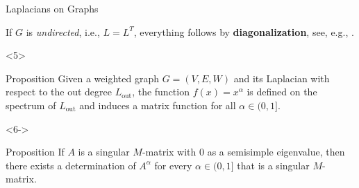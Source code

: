 \documentclass[aspectratio=169,xcolor=dvipsnames]{beamer}
\begin{document}
	\begin{frame}{Laplacians on Graphs}
		
	If $G$ is \emph{undirected}, i.e., $L = L^T$, everything follows by \textbf{diagonalization}, see, e.g., \parencite{Riascos2014}.
	


	\begin{onlyenv}
	\begin{alertblock}{Proposition \parencite{BenziDurastante}}
	Given a weighted graph $G = (V,E,W)$ and its Laplacian
	with respect to the out degree $L_{\text{out}}$, the function $f(x) = x^\alpha$ is defined on the spectrum of
	$L_{\text{out}}$ and induces a matrix function for all $\alpha \in (0,1]$.
	\end{alertblock}
	\end{onlyenv}

	\begin{onlyenv}<6->
	\begin{alertblock}{Proposition \parencite{BenziDurastante}}
	If $A$ is a singular $M$-matrix with 0 as a semisimple eigenvalue,
	then there exists a determination of $A^{\alpha}$ for every $\alpha \in (0,1]$ that is a singular $M$-matrix.
	\end{alertblock}
	\end{onlyenv}

	
	\end{frame}
\end{document}
